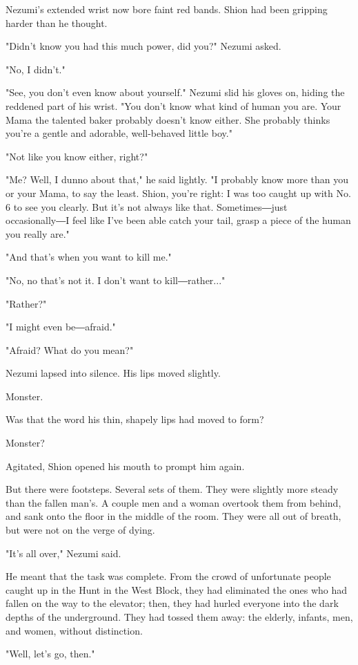 Nezumi's extended wrist now bore faint red bands. Shion had been
gripping harder than he thought.

"Didn't know you had this much power, did you?" Nezumi asked.

"No, I didn't."

"See, you don't even know about yourself." Nezumi slid his gloves on,
hiding the reddened part of his wrist. "You don't know what kind of
human you are. Your Mama the talented baker probably doesn't know
either. She probably thinks you're a gentle and adorable, well-behaved
little boy."

"Not like you know either, right?"

"Me? Well, I dunno about that," he said lightly. "I probably know more
than you or your Mama, to say the least. Shion, you're right: I was too
caught up with No. 6 to see you clearly. But it's not always like that.
Sometimes―just occasionally―I feel like I've been able catch your tail,
grasp a piece of the human you really are."

"And that's when you want to kill me."

"No, no that's not it. I don't want to kill―rather..."

"Rather?"

"I might even be―afraid."

"Afraid? What do you mean?"

Nezumi lapsed into silence. His lips moved slightly.

Monster.

Was that the word his thin, shapely lips had moved to form?

Monster?

Agitated, Shion opened his mouth to prompt him again.

But there were footsteps. Several sets of them. They were slightly more
steady than the fallen man's. A couple men and a woman overtook them
from behind, and sank onto the floor in the middle of the room. They
were all out of breath, but were not on the verge of dying.

"It's all over," Nezumi said.

He meant that the task was complete. From the crowd of unfortunate
people caught up in the Hunt in the West Block, they had eliminated the
ones who had fallen on the way to the elevator; then, they had hurled
everyone into the dark depths of the underground. They had tossed them
away: the elderly, infants, men, and women, without distinction.

"Well, let's go, then."

